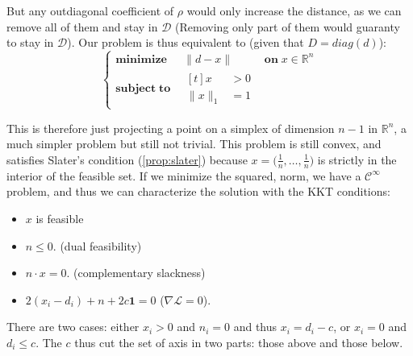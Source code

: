 \documentclass[10pt]{report}
\theoremstyle{plain}
\newtheorem{prop}[thm]{Property}
\theoremstyle{definition}
\theoremstyle{remark}
\newcommand{\R}{\ensuremath{\mathbb{R}}}
\renewcommand{\leq}{\leqslant}
\newcommand{\class}[1]{{\mathscr{C}^{#1}}}
\newcommand{\minima}[3]{\begin{cases}
    \mathbf{minimize}\;\,\quad #1& \mathbf{on}\; #2\\
    \mathbf{subject\;to}\quad \begin{aligned}[t]#3\end{aligned}
  \end{cases}}
\begin{document}
But any outdiagonal coefficient of $\rho$ would only increase the distance, as
we can remove all of them and stay in $\mathcal{D}$ (Removing only part of them
would guaranty to stay in $\mathcal{D}$). Our problem is thus equivalent to
(given that $D = diag(d)$):
\[\minima{\|d - x\|}{x \in\R^n}{ x&>0\\ \|x\|_1 &= 1}\]

This is therefore just projecting a point on a simplex of dimension $n-1$ in
$\R^n$, a much simpler problem but still not trivial. This problem is still
convex, and satisfies Slater's condition (\ref{prop:slater}) because $x = \big(\frac1n,\ldots,\frac1n\big)$
is strictly in the interior of the feasible set. If we minimize the squared,
norm, we have a $\class \infty$ problem, and thus we can characterize the
solution with the KKT conditions:
\begin{itemize}
\item $x$ is feasible
\item $n \leq 0$. (dual feasibility)
\item $n \cdot x = 0$. (complementary slackness)
\item $\displaystyle 2(x_i-d_i) + n + 2c \mathbf 1 = 0$ ($\nabla \mathcal{L} = 0$).
\end{itemize}

There are two cases: either $x_i > 0$ and $n_i = 0$ and thus $x_i = d_i - c$, or
$x_i = 0$ and $d_i \leq c$. The $c$ thus cut the set of axis in two parts: those above
and those below.








\end{document}
